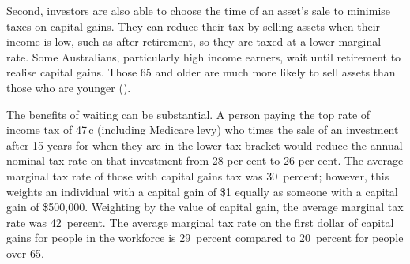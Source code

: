 \documentclass{grattan}\usepackage[]{graphicx}\usepackage[]{color}
\begin{document}
Second, investors are also able to choose the time of an asset's sale to minimise taxes on capital gains. They can reduce their tax by selling assets when their income is low, such as after retirement, so they are taxed at a lower marginal rate. Some Australians, particularly high income earners, wait until retirement to realise capital gains. Those 65 and older are much more likely to sell assets than those who are younger ().



The benefits of waiting can be substantial. A person paying the top rate of income tax of 47\,c (including Medicare levy) who times the sale of an investment after 15 years for when they are in the lower tax bracket would reduce the annual nominal tax rate on that investment from 28 per cent to 26 per cent. The average marginal tax rate of those with capital gains tax was 30~percent; however, this weights an individual with a capital gain of \$1 equally as someone with a capital gain of \$500,000. Weighting by the value of capital gain, the average marginal tax rate was 42~percent. The average marginal tax rate on the first dollar of capital gains for people in the workforce is 29~percent compared to 20~percent for people over 65.
\end{document}
